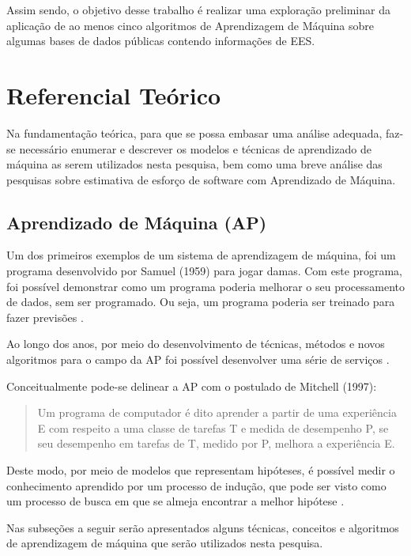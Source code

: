 \documentclass[12pt]{article}
\begin{document}
Assim sendo, o objetivo desse trabalho é realizar uma exploração preliminar da aplicação de ao menos cinco algoritmos de Aprendizagem de Máquina sobre algumas bases de dados públicas contendo informações de EES.

\section{Referencial Teórico} \label{sec:refteorico}

Na fundamentação teórica, para que se possa embasar uma análise adequada, faz-se necessário enumerar e descrever os modelos e técnicas de aprendizado de máquina as serem utilizados nesta pesquisa, bem como uma breve análise das pesquisas sobre estimativa de esforço de software com Aprendizado de Máquina.

\subsection{Aprendizado de Máquina (AP)}

Um dos primeiros exemplos de um sistema de aprendizagem de máquina, foi um programa desenvolvido por Samuel (1959) para jogar damas. Com este programa, foi possível demonstrar como um programa poderia melhorar o seu processamento de dados, sem ser programado. Ou seja, um programa poderia ser treinado para fazer previsões \cite{ieee:2013,samuel:1959}.

Ao longo dos anos, por meio do desenvolvimento de técnicas, métodos e novos algoritmos para o campo da AP foi possível desenvolver uma série de serviços \cite{abadaletal:2020}.

Conceitualmente pode-se delinear a AP com o postulado de Mitchell (1997):
\begin{quote}
  Um programa de computador é dito aprender a partir de uma experiência E com respeito a uma classe de tarefas T e medida de desempenho P, se seu desempenho em tarefas de T, medido por P, melhora a experiência E. \cite[p. 2, tradução nossa]{mitchell:1997}
\end{quote}

Deste modo, por meio de modelos que representam hipóteses, é possível medir o conhecimento aprendido por um processo de indução, que pode ser visto como um processo de busca em que se almeja encontrar a melhor hipótese \cite{stuartnorvig:2013}.

Nas subseções a seguir serão apresentados alguns técnicas, conceitos e algoritmos de aprendizagem de máquina que serão utilizados nesta pesquisa.
\end{document}
